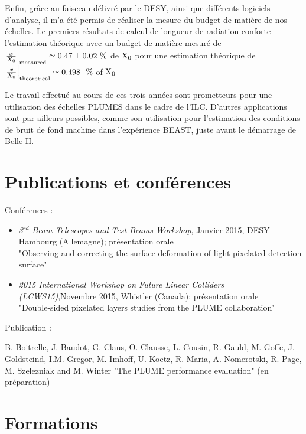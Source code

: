   Enfin, grâce au faisceau délivré par le DESY, ainsi que différents logiciels d'analyse, il m'a été permis de réaliser la mesure du budget de matière de nos échelles.
  Le premiers résultats de calcul de longueur de radiation conforte l'estimation théorique avec un budget de matière mesuré de  $\left. \frac{x}{X_0} \right|_{\rm{measured}} \simeq 0.47 \pm 0.02~\%$ de $\rm{X_0}$ pour une estimation théorique de $\left. \frac{x}{X_0}\right|_{\rm{theoretical}} \simeq 0.498~~\%$ of $\rm{X_0}$

  Le travail effectué au cours de ces trois années sont prometteurs pour une utilisation des échelles PLUMES dans le cadre de l'ILC.
  D'autres applications sont par ailleurs possibles, comme son utilisation pour l'estimation des conditions de bruit de fond machine dans l'expérience BEAST, juste avant le démarrage de Belle-II.

  \section*{Publications et conférences}

  Conférences :
  \begin{itemize}
    \item \textit{3$^{rd}$ Beam Telescopes and Test Beams Workshop}, Janvier 2015, DESY - Hambourg (Allemagne); présentation orale\\
    "Observing and correcting the surface deformation of light pixelated detection surface"
    \item \textit{2015 International Workshop on Future Linear Colliders (LCWS15)},Novembre 2015,  Whistler (Canada); présentation orale\\
    "Double-sided pixelated layers studies from the PLUME collaboration"
  \end{itemize}
  Publication :
  
  B. Boitrelle, J. Baudot, G. Claus, O. Clausse, L. Cousin, R. Gauld, M. Goffe, J. Goldsteind, I.M. Gregor, M. Imhoff, U. Koetz, R. Maria, A. Nomerotski, R. Page, M. Szelezniak and M. Winter "The PLUME performance evaluation" (en préparation)

  \section*{Formations}
 
